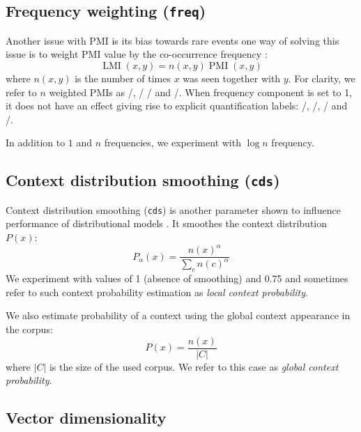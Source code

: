 \documentclass[11pt]{article}
\begin{document}
\subsection{Frequency weighting (\texttt{freq})}
\label{sec:frequency-weighting}

Another issue with PMI is its bias towards rare events \cite{TACL570} one way of solving this issue is to weight PMI value by the co-occurrence frequency \cite{Evert05}:
%
\begin{equation}
  \label{eq:lmi}
  \operatorname{LMI}(x, y) = n(x, y)\operatorname{PMI}(x, y)
\end{equation}
%
where $n(x, y)$ is the number of times $x$ was seen together with $y$. For clarity, we refer to $n$ weighted PMIs as \NPMI/, \NSPMI/ \NCPMI/ and \NSCPMI/. When frequency component is set to 1, it does not have an effect giving rise to explicit quantification labels: \PMI/, \SPMI/, \CPMI/ and \SCPMI/.

In addition to $1$ and $n$ frequencies, we experiment with $\log n$ frequency.



\subsection{Context distribution smoothing (\texttt{cds})}
\label{sec:cont-distr-smooth}

Context distribution smoothing (\texttt{cds}) is another parameter shown to influence performance of distributional models \cite{TACL570}. It smoothes the context distribution $P(x)$:
%
\begin{equation}
  \label{eq:cds}
  P_{\alpha}(x) = \frac{n(x)^{\alpha}}{\sum_{c}n(c)^{\alpha}}
\end{equation}
%
We experiment with values of 1 (absence of smoothing) and 0.75 and sometimes refer to such context probability estimation as \emph{local context probability}.

We also estimate probability of a context using the global context appearance in the corpus:
%
\begin{equation}
  \label{eq:cds-nan}
  P(x) = \frac{n(x)}{|C|}
\end{equation}
%
where $|C|$ is the size of the used corpus. We refer to this case as \emph{global context probability}.

\subsection{Vector dimensionality}
\label{sec:vect-dimens}
\end{document}
